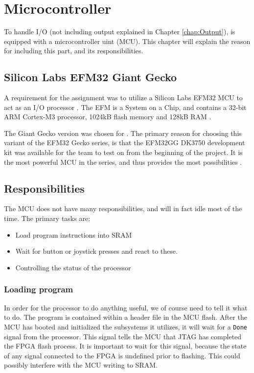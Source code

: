 \chapter{Microcontroller}

To handle I/O (not including output explained in Chapter \ref{chap:Output}), \vthreek is equipped with a microcontroller uint (MCU).
This chapter will explain the reason for including this part, and its responsibilities. 

\section{Silicon Labs EFM32 Giant Gecko}
A requirement for the assignment was to utilize a Silicon Labs EFM32 MCU to act as an I/O processor \cite{assignment-text}.
The EFM is a System on a Chip, and contains a 32-bit ARM Cortex-M3 processor, 1024kB flash memory and 128kB RAM \cite{efm32referencemanual}.

The Giant Gecko version was chosen for \vthreek.
The primary reason for choosing this variant of the EFM32 Gecko series, is that the EFM32GG DK3750 development kit was available for the team to test on from the beginning of the project.
It is the most powerful MCU in the series, and thus provides the most possibilities \cite{}.

\section{Responsibilities}
The MCU does not have many responsibilities, and will in fact idle most of the time. 
The primary tasks are: 
\begin{itemize}
\item Load program instructions into SRAM
\item Wait for button or joystick presses and react to these.
\item Controlling the status of the processor
\end{itemize}

\subsection{Loading program}
In order for the processor to do anything useful, we of course need to tell it what to do.
The program is contained within a header file in the MCU flash.
After the MCU has booted and initialized the subsystems it utilizes, it will wait for a \texttt{Done} signal from the processor.
This signal tells the MCU that JTAG has completed the FPGA flash process. 
It is important to wait for this signal, because the state of any signal connected to the FPGA is undefined prior to flashing.
This could possibly interfere with the MCU writing to SRAM.

